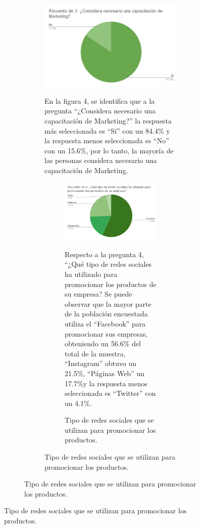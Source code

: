 \documentclass[12pt]{difu100cia} %
\begin{document}
\begin{figure}[!htb]
\begin{figure}[!htb]
\begin{figure}[!htb]
	\centering
	\includegraphics[width=\linewidth]{Figura 4.png}
	\caption{Necesidad de capacitación en Marketing}
	\label{diagrama_bloque_rfnoc}
	
En la figura 4, se identifica que a la pregunta “¿Considera necesario una capacitación de Marketing?” la respuesta más seleccionada es “Sí” con un 84.4\% y la respuesta menos seleccionada es “No” con un 15.6\%, por lo tanto, la mayoría de las personas considera necesario una capacitación de Marketing.

\begin{figure}[!htb]
	\centering
	\includegraphics[width=\linewidth]{Figura 5.png}
	\caption{Tipo de redes sociales que se utilizan para promocionar los productos.}
	\label{diagrama_bloque_rfnoc}
	
Respecto a la pregunta 4, “¿Qué tipo de redes sociales ha utilizado para promocionar los productos de su empresa?  Se puede observar que la mayor parte de la población encuestada utiliza el “Facebook” para promocionar sus empresas, obteniendo un 56.6\% del total de la muestra, “Instagram” obtuvo un 21.5\%, “Páginas Web” un 17.7\%y la respuesta menos seleccionada es “Twitter” con un 4.1\%.


\end{figure}
\end{figure}
\end{figure}
\end{figure}
\end{document}
